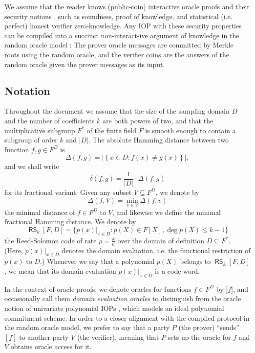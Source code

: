 \documentclass[11pt]{article}
\theoremstyle{definition}
\theoremstyle{remark}
\DeclareMathOperator{\RS}{\mathsf{RS}}
\begin{document}
We assume that the reader knows (public-coin) interactive oracle proofs and their security notions  \cite{IOPs}, such as soundness, proof of knowledge, and statistical (i.e. perfect) honest verifier zero-knowledge. 
Any IOP with these security properties can be compiled into a succinct non-interact-ive argument of knowledge in the random oracle model \cite{IOPs}:
The prover oracle messages are committed by Merkle roots using the random oracle, and the verifier coins are the answers of the random oracle given the prover messages as its input.


\subsection{Notation}
Throughout the document we assume that the size of the sampling domain $D$ and the number of coefficients $k$ are both powers of two, and that the multiplicative subgroup $F^*$ of the finite field $F$ is smooth enough to contain a subgroup of order $k$ and $|D|$. 
The absolute Hamming distance between two function $f,g\in F^D$ is
\begin{equation*}
\Delta(f, g) = \big|\left\{x\in D: f(x)\neq g(x)\right\}\big|,
\end{equation*}
and we shall write 
\[
\delta(f, g) = \frac{1}{|D|}\cdot \Delta(f,g)
\] 
for its fractional variant.
Given any subset $V\subseteq F^D$, we denote by
\[
\Delta(f, V) = \min_{v\in V} \Delta(f,v)
\]
the minimal distance of $f\in F^D$ to $V$, and likewise we define the minimal fractional Hamming distance.
We denote by
\begin{equation*}
\RS_k[F,D] = \big\{ \left.p(x)\right|_{x\in D} : p(X)\in F[X], \deg p(X) \leq k-1 \big\}
\end{equation*}
the Reed-Solomon code of rate $\rho = \frac{k}{n}$ over the domain of definition $D\subseteq F^*$. 
(Here, $p(x)|_{x\in D}$ denotes the domain evaluation, i.e.  the functional restriction of $p(x)$ to $D$.)
Whenever we say that a polynomial $p(X)$ belongs to $\RS_k[F,D]$, we mean that its domain evaluation $p(x)|_{x\in D}$ is a code word. 

In the context of oracle proofs, we denote oracles for  functions $f\in F^D$ by
$\big[ f \big]$, and occasionally call them \textit{domain evaluation oracles} to distinguish from the oracle notion of univariate polynomial IOPs \cite{DARK}, which models an ideal polynomial commitment scheme.
In order to a closer alignment with the compiled protocol in the random oracle model, we prefer to say that a party $P$ (the prover) ``sends'' $[f]$ to another party $V$ (the verifier), meaning that $P$ sets
up the oracle for $f$ and $V$ obtains oracle access for it.
\end{document}
